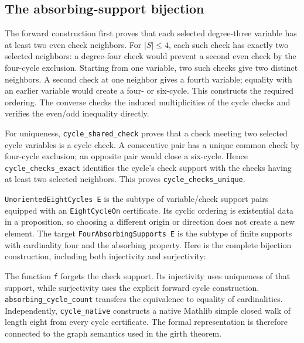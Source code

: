\documentclass[11pt]{article}
\theoremstyle{definition}
\theoremstyle{remark}
\begin{document}
\subsection{The absorbing-support bijection}\label{sec:lean-bijection}

The forward construction first proves that each selected degree-three
variable has at least two even check neighbors. For $|S|\le4$, each such
check has exactly two selected neighbors: a degree-four check would
prevent a second even check by the four-cycle exclusion. Starting from
one variable, two such checks give two distinct neighbors. A second check
at one neighbor gives a fourth variable; equality with an earlier variable
would create a four- or six-cycle. This constructs the required ordering.
The converse checks the induced multiplicities of the cycle checks and
verifies the even/odd inequality directly.

For uniqueness, \texttt{cycle\_shared\_check} proves that a check meeting
two selected cycle variables is a cycle check. A consecutive pair has a
unique common check by four-cycle exclusion; an opposite pair would close
a six-cycle. Hence \texttt{cycle\_checks\_exact} identifies the cycle's
check support with the checks having at least two selected neighbors.
This proves \texttt{cycle\_checks\_unique}.

\texttt{UnorientedEightCycles E} is the subtype of variable/check support
pairs equipped with an \texttt{EightCycleOn} certificate. Its cyclic
ordering is existential data in a proposition, so choosing a different
origin or direction does not create a new element. The target
\texttt{FourAbsorbingSupports E} is the subtype of finite supports with
cardinality four and the absorbing property. Here is the complete
bijection construction, including both injectivity and surjectivity:
\par\medskip\noindent\begin{minipage}{\linewidth}

\end{minipage}\par\medskip
The function \texttt{f} forgets the check support. Its injectivity uses
uniqueness of that support, while surjectivity uses the explicit forward
cycle construction. \texttt{absorbing\_cycle\_count} transfers the
equivalence to equality of cardinalities. Independently,
\texttt{cycle\_native} constructs a native Mathlib simple closed walk of
length eight from every cycle certificate. The formal representation is
therefore connected to the graph semantics used in the girth theorem.
\end{document}
